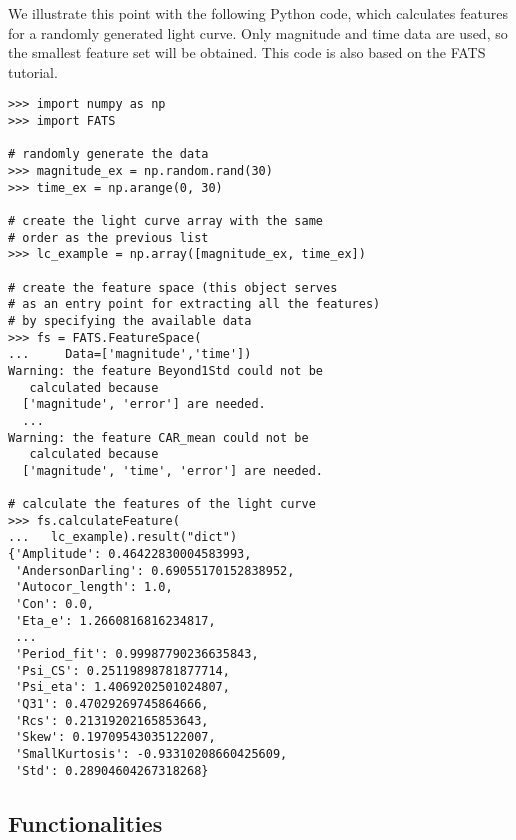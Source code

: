 \documentclass[final,5p,times,twocolumn,authoryear]{elsarticle}
\begin{document}
We illustrate this point with the following Python code, 
which calculates features for a randomly generated light curve. 
Only magnitude and time data are used, so the smallest feature set will be obtained. This code is also based on the FATS tutorial.
\begin{verbatim}
>>> import numpy as np
>>> import FATS

# randomly generate the data
>>> magnitude_ex = np.random.rand(30)
>>> time_ex = np.arange(0, 30)

# create the light curve array with the same 
# order as the previous list
>>> lc_example = np.array([magnitude_ex, time_ex])

# create the feature space (this object serves 
# as an entry point for extracting all the features) 
# by specifying the available data
>>> fs = FATS.FeatureSpace(
...     Data=['magnitude','time'])
Warning: the feature Beyond1Std could not be 
   calculated because 
  ['magnitude', 'error'] are needed.
  ...
Warning: the feature CAR_mean could not be 
   calculated because 
  ['magnitude', 'time', 'error'] are needed.

# calculate the features of the light curve
>>> fs.calculateFeature(
...   lc_example).result("dict")
{'Amplitude': 0.46422830004583993,
 'AndersonDarling': 0.69055170152838952,
 'Autocor_length': 1.0,
 'Con': 0.0,
 'Eta_e': 1.2660816816234817,
 ...
 'Period_fit': 0.99987790236635843,
 'Psi_CS': 0.25119898781877714,
 'Psi_eta': 1.4069202501024807,
 'Q31': 0.47029269745864666,
 'Rcs': 0.21319202165853643,
 'Skew': 0.19709543035122007,
 'SmallKurtosis': -0.93310208660425609,
 'Std': 0.28904604267318268}
\end{verbatim}

\subsection{Functionalities}
\end{document}
